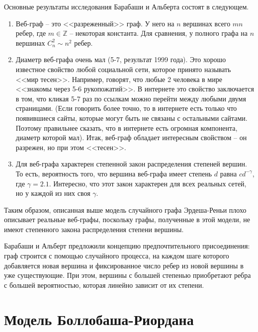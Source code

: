 \documentclass[14pt]{extreport}
\begin{document}
Основные результаты исследования Барабаши и Альберта состоят в следующем.
\begin{enumerate}

\item Веб-граф -- это <<разреженный>> граф. У него на $n$ вершинах всего $mn$ ребер, где $m \in \mathbb{Z}$ -- некоторая константа. Для сравнения, у полного графа на $n$ вершинах $C_n^2 \sim n^2$ ребер. 

\item Диаметр веб-графа очень мал (5-7, результат 1999 года). Это хорошо известное свойство любой социальной сети, которое принято называть <<мир тесен>>. Например, говорят, что любые 2 человека в мире <<знакомы через 5-6 рукопожатий>>. В интернете это свойство заключается в том, что кликая 5-7 раз по ссылкам можно перейти между любыми двумя страницами. (Если говорить более точно, то в интернете есть только что появившиеся сайты, которые могут быть не связаны с остальными сайтами. Поэтому правильнее сказать, что в интернете есть огромная компонента, диаметр которой мал). Итак, веб-граф обладает интересным свойством -- он разрежен, но при этом <<тесен>>.

\item Для веб-графа характерен степенной закон распределения степеней вершин. То есть, вероятность того, что вершина веб-графа имеет степень $d$ равна $cd^{-\gamma}$, где $\gamma = 2.1$. Интересно, что этот закон характерен для всех реальных сетей, но у каждой из них своя $\gamma$.
\end{enumerate}

Таким образом, описанная выше модель случайного графа Эрдеша-Реньи плохо описывает реальные веб-графы, поскольку графы, полученные в этой модели, не имеют степенного закона распределения степени вершины. 

Барабаши и Альберт предложили концепцию предпочтительного присоединения: граф строится с помощью случайного процесса, на каждом шаге которого добавляется новая вершина и фиксированное число ребер из новой вершины в уже существующие. При этом, вершины с большей степенью приобретают ребра с большей вероятностью, которая линейно зависит от их степени.

\section{Модель Боллобаша-Риордана}
\end{document}
